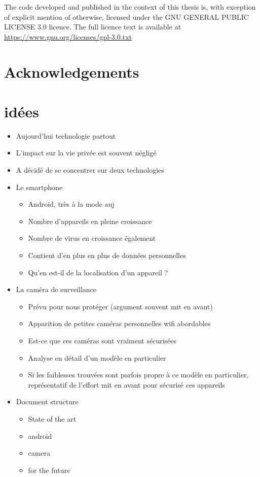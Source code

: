 The code developed and published in the context of this thesis is, with exception of explicit mention of otherwise, licensed under the GNU GENERAL PUBLIC LICENSE 3.0 licence. The full licence text is available at \url{https://www.gnu.org/licenses/gpl-3.0.txt}

\section{Acknowledgements}


\section{idées}

\begin{itemize}
\item Aujourd'hui technologie partout
\item L'impact sur la vie privée est souvent négligé
\item A décidé de se concentrer sur deux technologies
\item Le smartphone
  \begin{itemize}
  \item Android, très à la mode auj
  \item Nombre d'appareils en pleine croissance
  \item Nombre de virus en croissance également
  \item Contient d'en plus en plus de données personnelles
  \item Qu'en est-il de la localisation d'un appareil ?
  \end{itemize}
\item La caméra de surveillance
  \begin{itemize}
  \item Prévu pour nous protéger (argument souvent mit en avant)
  \item Apparition de petites caméras personnelles wifi abordables
  \item Est-ce que ces caméras sont vraiment sécurisées
  \item Analyse en détail d'un modèle en particulier
  \item Si les faiblesses trouvées sont parfois propre à ce modèle en particulier, représentatif de l'effort mit en avant pour sécurisé ces appareils
  \end{itemize}
\item Document structure
  \begin{itemize}
  \item State of the art
  \item android
  \item camera
  \item for the future
  \end{itemize}
\end{itemize}